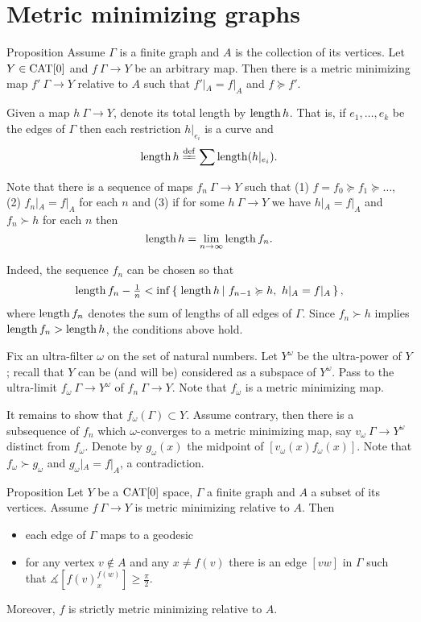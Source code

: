 \documentclass[a4paper,10pt]{amsart}
\begin{document}
\section{Metric minimizing graphs}



\begin{thm}{Proposition}
Assume $\Gamma$ is a  finite graph and $A$ is the collection of its vertices.
Let $Y\in\mathop{\rm CAT}\nolimits[0]$ and $f\:\Gamma\to Y$ be an arbitrary map.
Then there is a metric minimizing map $f'\:\Gamma\to Y$ relative to $A$ such that
$f'|_A=f|_A$ and 
$f\succcurlyeq f'$.
\end{thm} 

Given a map $h\:\Gamma\to Y$, denote its total length by $\mathop{\rm length}\nolimits h$.
That is, if $e_1,\dots,e_k$ be the edges of $\Gamma$ 
then each restriction $h|_{e_i}$ is a curve and
\[\length h
\df
\sum\length(h|_{e_i}).\]

Note that there is a sequence of maps $f_n\:\Gamma\to Y$
such that (1)
$f=f_0\succcurlyeq f_1\succcurlyeq\dots$, (2) $f_n|_A=f|_A$ for each $n$ and (3) if for some $h\:\Gamma\to Y$ we have $h|_A=f|_A$ and $f_n\succ h$ for each $n$ then 
\[\mathop{\rm length}\nolimits h=\lim_{n\to\infty}\mathop{\rm length}\nolimits f_n.\]

Indeed, the sequence $f_n$ can be chosen so that
\[\length f_n-\tfrac1n
<
\inf\set{\length h}{f_{n-1}\succcurlyeq h,\ h|_A=f|_A},\]
where $\mathop{\rm length}\nolimits f_n$ denotes the sum of lengths of all edges of $\Gamma$. %
Since $f_n\succ h$ implies $\mathop{\rm length}\nolimits f_n>\mathop{\rm length}\nolimits h$, 
the conditions above hold.

Fix an ultra-filter $\omega$ on the set of natural numbers.
Let $Y^\omega$ be the ultra-power of $Y$;
recall that $Y$ can be (and will be) considered as a subspace of $Y^\omega$.
Pass to the ultra-limit $f_\omega\:\Gamma\to Y^\omega$ 
of $f_n\:\Gamma\to Y$.
Note that $f_\omega$ is a metric minimizing map.

It remains to show that $f_\omega(\Gamma)\subset Y$.
Assume contrary, then there is a subsequence of $f_n$ which $\omega$-converges to a metric minimizing map, say $v_\omega\:\Gamma\to Y^\omega$ distinct from $f_\omega$.
Denote by $g_\omega(x)$ the midpoint of $[v_\omega(x)f_\omega(x)]$.
Note that $f_\omega\succ g_\omega$ and $g_\omega|_A=f|_A$, a contradiction.
\qeds

\begin{thm}{Proposition}\label{prop:metric-min-graph}
Let $Y$ be a $\mathop{\rm CAT}\nolimits[0]$ space, 
$\Gamma$ a finite  graph and $A$ a subset of its vertices.
Assume $f\:\Gamma\to Y$ is metric minimizing relative to $A$.
Then
\begin{itemize}
\item each edge of $\Gamma$ maps to a geodesic
\item for any vertex $v\notin A$ and any $x\ne f(v)$
there is an edge  $[vw]$ in $\Gamma$ such that
$\measuredangle[f(v)^{f(w)}_x]\ge \tfrac\pi2$.
\end{itemize}
Moreover, $f$ is strictly metric minimizing relative to $A$. 
\end{thm}
\end{document}
